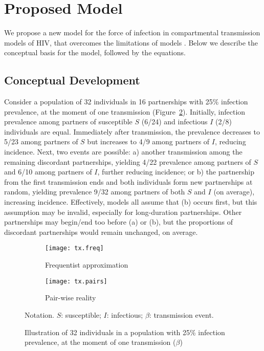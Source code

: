 \section{Proposed Model}\label{prop}
We propose a new model for the force of infection in compartmental transmission models of HIV,
that overcomes the limitations of models .
Below we describe the conceptual basis for the model, followed by the equations.
\subsection{Conceptual Development}\label{prop.cd}
Consider a population of 32 individuals in 16 partnerships with 25\% infection prevalence,
at the moment of one transmission (Figure~\ref{fig:tx.pairs}).
Initially, infection prevalence among partners
of susceptible $S$ (6/24) and infectious $I$ (2/8) individuals are equal.
Immediately after transmission, the prevalence
decreases to 5/23 among partners of $S$ but increases to 4/9 among partners of $I$, reducing incidence.
Next, two events are possible:
a) another transmission among the remaining discordant partnerships,
yielding 4/22 prevalence among partners of $S$ and 6/10 among partners of $I$,
further reducing incidence; or
b) the partnership from the first transmission ends
and both individuals form new partnerships at random,
yielding prevalence 9/32 among partners of both $S$ and $I$ (on average), increasing incidence.
Effectively, models  all assume that (b) occurs first,
but this assumption may be invalid, especially for long-duration partnerships.
Other partnerships may begin/end too before (a) or (b),
but the proportions of discordant partnerships would remain unchanged, on average.
\begin{figure}[h]
  \begin{subfigure}{\textwidth}
    \centerline{\texttt{[image: tx.freq]}}
    \caption{Frequentist approximation}
    \label{fig:tx.freq}
  \end{subfigure}
  \begin{subfigure}{\textwidth}
    \centerline{\texttt{[image: tx.pairs]}}
    \caption{Pair-wise reality}
    \label{fig:tx.pairs}
  \end{subfigure}
  \caption{Illustration of 32 individuals in a population with 25\% infection prevalence,
    at the moment of one transmission ($\beta$)}
  \label{fig:tx}
  \floatfoot
  Notation. $S$: susceptible; $I$: infectious; $\beta$: transmission event.
\end{figure}
